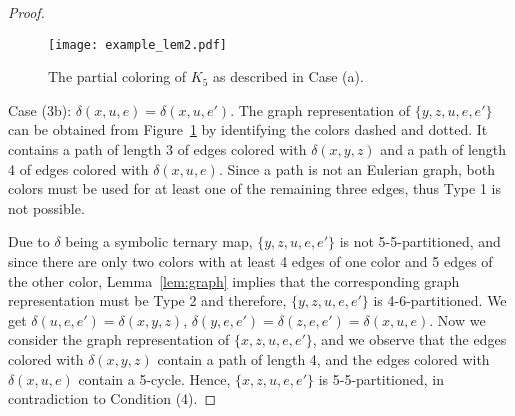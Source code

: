 \documentclass{article}
\begin{document}
\begin{proof}
% 
\begin{figure}[ht!]
\centering  
\texttt{[image: example\_lem2.pdf]} 
\caption{The partial coloring of $K_5$ as described in Case (a).} 
\label{fig:example_lem2} 
\end{figure}

 
Case (3b): $\delta(x,u,e)= \delta(x,u,e')$. The graph representation of $\{y,z,u,e,e'\}$ 
can be obtained from Figure~\ref{fig:example_lem2} by identifying the colors dashed and dotted. 
It contains a path of length 3 
of edges colored with $\delta(x,y,z)$ and a path of length 4 of edges colored 
with $\delta(x,u,e)$. Since a path is not an Eulerian graph, both colors must be 
used for at least one of the remaining three edges, thus Type 1 is not possible. 


Due to $\delta$ being a symbolic ternary map,
$\{y,z,u,e,e'\}$ is not 5-5-partitioned, and since there are only two colors
with at least 4 edges of one color and 5 edges of the other color, Lemma~\ref{lem:graph}
implies that the corresponding graph representation must be Type 2 and
therefore, $\{y,z,u,e,e'\}$ is 4-6-partitioned.
We get $\delta(u,e,e')=\delta(x,y,z)$, 
$\delta(y,e,e')=\delta(z,e,e')=\delta(x,u,e)$. Now we consider the graph representation 
of $\{x,z,u,e,e'\}$, and we observe that the edges colored with $\delta(x,y,z)$ contain a 
path of length 4, and the edges colored with $\delta(x,u,e)$ contain a 5-cycle. Hence, 
$\{x,z,u,e,e'\}$ is 5-5-partitioned, in contradiction to Condition (4). 
\end{proof}
\end{document}

